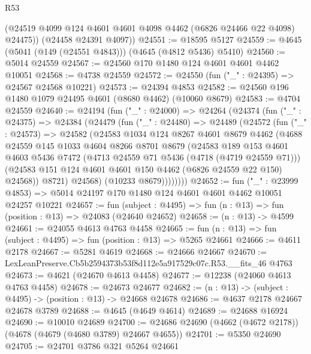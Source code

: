\begin{lexlean}{R53}
\begin{coremodule}
        (@24519 @4099 @124 @4601 @4601 @4098 @4462 (@6826 @24466 @22 @4098) @24475))
      (@24458 @24391 @4097))
@24551 := @18595 @5127
@24559 := @4645 (@5041 (@149 (@24551 @4843))) (@4645 (@4812 @5436) @5410)
@24560 := @5014 @24559
@24567 := @24560 @170 @1480 @124 @4601 @4601 @4462 @10051
@24568 := @4738 @24559
@24572 := @24550 (fun ("_" : @24395) => @24567 @24568 @10221)
@24573 := @24394 @4853
@24582 := @24560 @196 @1480 @1079 @24495 @4601 (@8680 @4462) (@10060 @8679)
@24583 := @4704 @24559
@24640 := @24194
    (fun ("_" : @24000) =>
    @24264
      (@24374
        (fun ("_" : @24375) =>
        @24384
          (@24479
            (fun ("_" : @24480) =>
            @24489
              (@24572
                (fun ("_" : @24573) =>
                @24582
                  (@24583
                    @1034
                    @124
                    @8267
                    @4601
                    @8679
                    @4462
                    (@4688
                      @24559
                      @145
                      @1033
                      @4604
                      @8266
                      @8701
                      @8679
                      (@24583
                        @189
                        @153
                        @4601
                        @4603
                        @5436
                        @7472
                        (@4713 @24559 @71 @5436 (@4718 (@4719 @24559 @71)))
                        (@24583 @151 @124 @4601 @4601 @150 @4462 (@6826 @24559 @22 @150) @24568))
                      @8721)
                    @24568)
                  (@10233 @8679))))))))
@24652 := fun ("_" : @23999 @4853) =>
  @5014 @24197 @170 @1480 @124 @4601 @4601 @4462 @10051 @24257 @10221
@24657 := fun (subject : @4495) => fun (n : @13) => fun (position : @13) => @24083 (@24640 @24652)
@24658 := (n : @13) -> @4599
@24661 := @24055 @4613 @4763 @4458
@24665 := fun (n : @13) => fun (subject : @4495) => fun (position : @13) => @5265 @24661
@24666 := @4611 @2178
@24667 := @5281 @4619
@24668 := @24666 @24667
@24670 := LexLeanPreserve.Cb5b2594373b53f8d112e5a917529c07c.R53.__fits_46 @4763
@24673 := @4621 (@24670 @4613 @4458)
@24677 := @12238 (@24060 @4613 @4763 @4458)
@24678 := @24673 @24677
@24682 := (n : @13) -> (subject : @4495) -> (position : @13) -> @24668 @24678
@24686 := @4637 @2178 @24667 @24678 @3789
@24688 := @4645 (@4649 @4614)
@24689 := @24688 @16924
@24690 := @10010 @24689
@24700 := @24686 @24690 (@4662 (@4672 @2178)) (@4678 (@4679 (@4680 @3789) @24667 @4655))
@24701 := @5350 @24690
@24705 := @24701 @3786 @321 @5264 @24661

\end{coremodule}
\end{lexlean}
